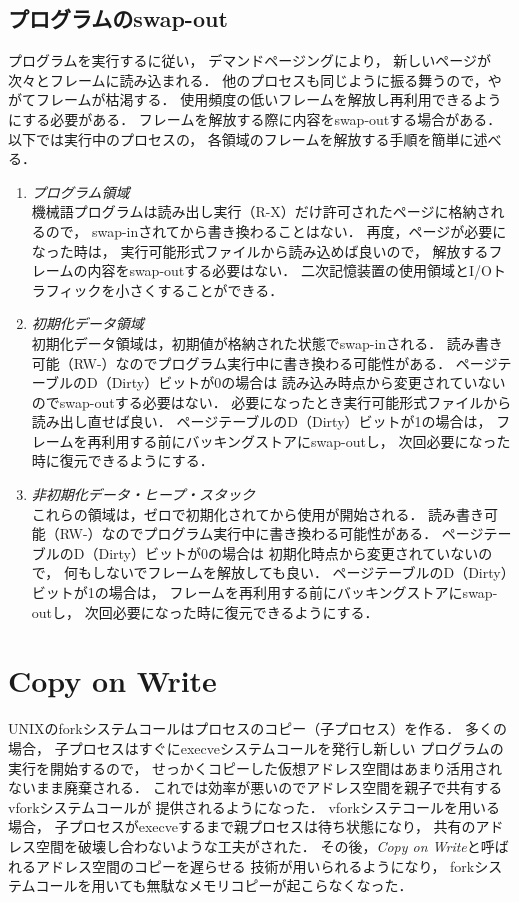 \subsection{プログラムのswap-out}
プログラムを実行するに従い，
デマンドページングにより，
新しいページが次々とフレームに読み込まれる．
他のプロセスも同じように振る舞うので，やがてフレームが枯渇する．
使用頻度の低いフレームを解放し再利用できるようにする必要がある．
フレームを解放する際に内容をswap-outする場合がある．
以下では実行中のプロセスの，
各領域のフレームを解放する手順を簡単に述べる．

\begin{enumerate}
\item \emph{プログラム領域} \\
機械語プログラムは読み出し実行（R-X）だけ許可されたページに格納されるので，
swap-inされてから書き換わることはない．
再度，ページが必要になった時は，
実行可能形式ファイルから読み込めば良いので，
解放するフレームの内容をswap-outする必要はない．
二次記憶装置の使用領域とI/Oトラフィックを小さくすることができる．

\item \emph{初期化データ領域} \\
初期化データ領域は，初期値が格納された状態でswap-inされる．
読み書き可能（RW-）なのでプログラム実行中に書き換わる可能性がある．
ページテーブルのD（Dirty）ビットが0の場合は
読み込み時点から変更されていないのでswap-outする必要はない．
必要になったとき実行可能形式ファイルから読み出し直せば良い．
ページテーブルのD（Dirty）ビットが1の場合は，
フレームを再利用する前にバッキングストアにswap-outし，
次回必要になった時に復元できるようにする．

\item \emph{非初期化データ・ヒープ・スタック} \\
これらの領域は，ゼロで初期化されてから使用が開始される．
読み書き可能（RW-）なのでプログラム実行中に書き換わる可能性がある．
ページテーブルのD（Dirty）ビットが0の場合は
初期化時点から変更されていないので，
何もしないでフレームを解放しても良い．
ページテーブルのD（Dirty）ビットが1の場合は，
フレームを再利用する前にバッキングストアにswap-outし，
次回必要になった時に復元できるようにする．
\end{enumerate}

\section{Copy on Write}
UNIXのforkシステムコールはプロセスのコピー（子プロセス）を作る．
多くの場合，
子プロセスはすぐにexecveシステムコールを発行し新しい
プログラムの実行を開始するので，
せっかくコピーした仮想アドレス空間はあまり活用されないまま廃棄される．
これでは効率が悪いのでアドレス空間を親子で共有するvforkシステムコールが
提供されるようになった．
vforkシステコールを用いる場合，
子プロセスがexecveするまで親プロセスは待ち状態になり，
共有のアドレス空間を破壊し合わないような工夫がされた．
その後，\emph{Copy on Write}と呼ばれるアドレス空間のコピーを遅らせる
技術が用いられるようになり，
forkシステムコールを用いても無駄なメモリコピーが起こらなくなった．

